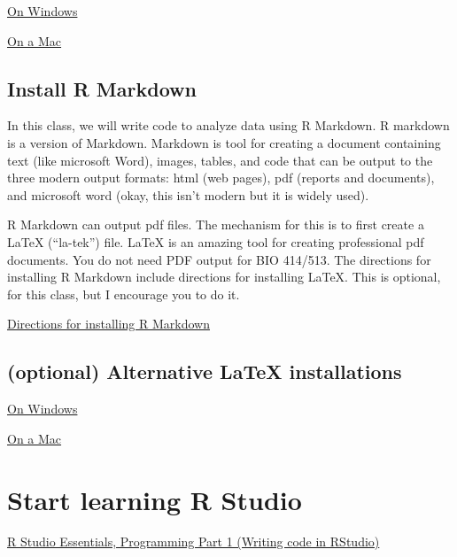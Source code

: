 \documentclass[]{book}
\begin{document}
\href{https://medium.com/@GalarnykMichael/install-r-and-rstudio-on-windows-5f503f708027}{On Windows}

\href{https://medium.com/@GalarnykMichael/install-r-and-rstudio-on-mac-e911606ce4f4}{On a Mac}

\hypertarget{install-r-markdown-1}{%
\subsection{Install R Markdown}\label{install-r-markdown-1}}

In this class, we will write code to analyze data using R Markdown. R markdown is a version of Markdown. Markdown is tool for creating a document containing text (like microsoft Word), images, tables, and code that can be output to the three modern output formats: html (web pages), pdf (reports and documents), and microsoft word (okay, this isn't modern but it is widely used).

R Markdown can output pdf files. The mechanism for this is to first create a LaTeX (``la-tek'') file. LaTeX is an amazing tool for creating professional pdf documents. You do not need PDF output for BIO 414/513. The directions for installing R Markdown include directions for installing LaTeX. This is optional, for this class, but I encourage you to do it.

\href{https://bookdown.org/yihui/rmarkdown/installation.html\#installation}{Directions for installing R Markdown}

\hypertarget{optional-alternative-latex-installations}{%
\subsection{(optional) Alternative LaTeX installations}\label{optional-alternative-latex-installations}}

\href{https://medium.com/@sorenlind/create-pdf-reports-using-r-r-markdown-latex-and-knitr-on-windows-10-952b0c48bfa9}{On Windows}

\href{https://medium.com/@sorenlind/create-pdf-reports-using-r-r-markdown-latex-and-knitr-on-macos-high-sierra-e7b5705c9fd}{On a Mac}

\hypertarget{start-learning-r-studio}{%
\section{Start learning R Studio}\label{start-learning-r-studio}}

\href{https://rstudio.com/resources/webinars/programming-part-1-writing-code-in-rstudio/}{R Studio Essentials, Programming Part 1 (Writing code in RStudio)}
\end{document}
